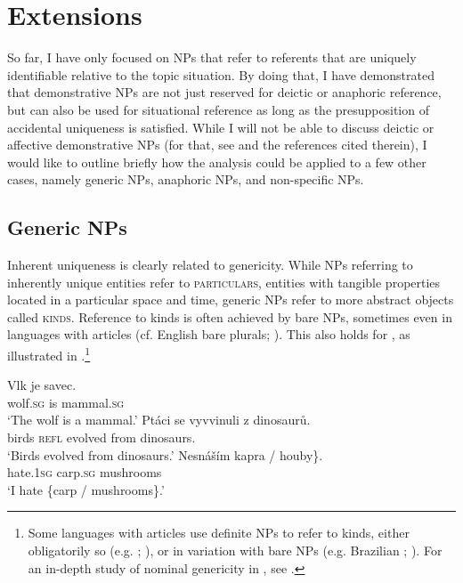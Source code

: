 \documentclass[output=paper,colorlinks,citecolor=brown,newtxmath]{langscibook}
\begin{document}
\section{Extensions}\label{simik:sec:extension}

So far, I have only focused on NPs that refer to referents that are uniquely identifiable relative to the topic situation. By doing that, I have demonstrated that  demonstrative NPs are not just reserved for deictic or anaphoric reference, but can also be used for situational reference as long as the presupposition of accidental uniqueness is satisfied. While I will not be able to discuss deictic or affective demonstrative NPs (for that, see \citealt{Simik2016} and the references cited therein), I would like to outline briefly how the analysis could be applied to a few other cases, namely generic NPs, anaphoric NPs, and non-specific NPs.

\subsection{Generic NPs}

Inherent uniqueness is clearly related to genericity. While NPs referring to inherently unique entities refer to \textsc{particulars}, entities with tangible properties located in a particular space and time, generic NPs refer to more abstract objects called \textsc{kinds}. Reference to kinds is often achieved by bare NPs, sometimes even in languages with articles (cf. English bare plurals; \citealt{Carlson1977}). This also holds for , as illustrated in .\footnote{Some languages with articles use definite NPs to refer to kinds, either obligatorily so (e.g. ; \citealt{Borik.Espinal2015}), or in variation with bare NPs (e.g. Brazilian ; \citealt{Schmitt.Munn1999}). For an in-depth study of nominal genericity in , see \citet{Seresinprep}.}

\ea\label{simik:ex:gen}
\ea\label{simik:ex:gen-a}\gll Vlk je savec.\\
wolf.\textsc{sg} is mammal.\textsc{sg}\\
\glt `The wolf is a mammal.'
\ex\gll Ptáci se vyvvinuli z dinosaurů.\\
birds \textsc{refl} evolved from dinosaurs.\\
\glt `Birds evolved from dinosaurs.'
\ex\gll Nesnáším \minsp{\{} kapra / houby\}.\\
hate.\textsc{1sg} {} carp.\textsc{sg} {} mushrooms\\
\glt `I hate \{carp / mushrooms\}.'
\z\z
\end{document}
